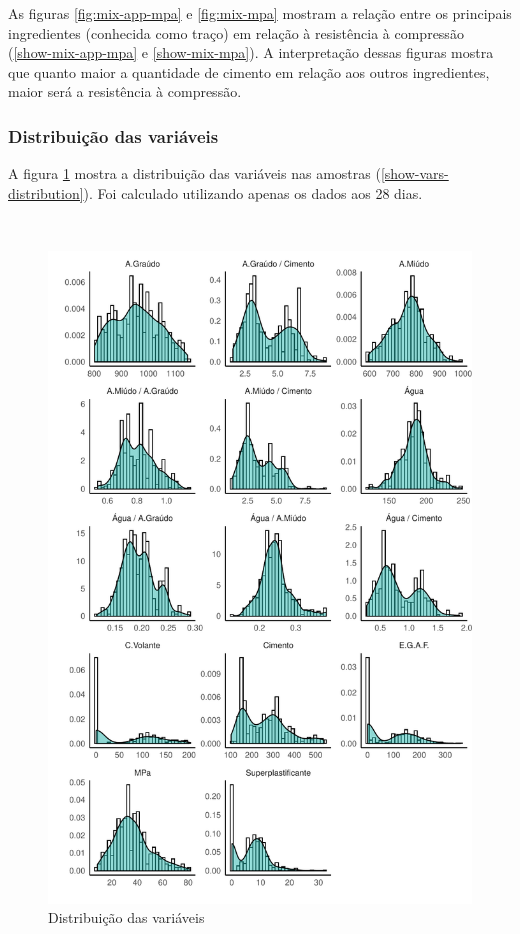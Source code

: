 \documentclass[]{article}
\begin{document}
As figuras \ref{fig:mix-app-mpa} e \ref{fig:mix-mpa} mostram a relação
entre os principais ingredientes (conhecida como traço) em relação à
resistência à compressão (\ref{show-mix-app-mpa} e \ref{show-mix-mpa}).
A interpretação dessas figuras mostra que quanto maior a quantidade de
cimento em relação aos outros ingredientes, maior será a resistência à
compressão.

\hypertarget{distribuiuxe7uxe3o-das-variuxe1veis}{%
\subsubsection{Distribuição das
variáveis}\label{distribuiuxe7uxe3o-das-variuxe1veis}}

A figura \ref{fig:vars-distribution} mostra a distribuição das variáveis
nas amostras (\ref{show-vars-distribution}). Foi calculado utilizando
apenas os dados aos 28 dias.

~

\begin{figure}

{\centering \includegraphics{paper_PT_files/figure-latex/vars-distribution-1} 

}

\caption{Distribuição das variáveis}\label{fig:vars-distribution}
\end{figure}
\end{document}
